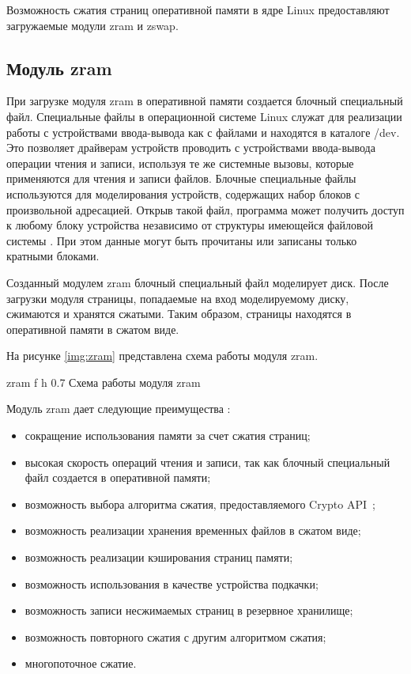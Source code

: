 Возможность сжатия страниц оперативной памяти в ядре Linux предоставляют загружаемые модули zram и zswap.

\subsection{Модуль zram}

При загрузке модуля zram в оперативной памяти создается блочный специальный файл. Специальные файлы в операционной системе Linux служат для реализации работы с устройствами ввода-вывода как с файлами и находятся в каталоге /dev. Это позволяет драйверам устройств проводить с устройствами ввода-вывода операции чтения и записи, используя те же системные
вызовы, которые применяются для чтения и записи файлов. Блочные специальные файлы используются для моделирования устройств, содержащих набор блоков с произвольной адресацией. Открыв такой файл, программа может получить доступ к любому блоку устройства независимо от структуры имеющейся файловой системы \cite{block-file}. При этом данные могут быть прочитаны или записаны только кратными блоками.

Созданный модулем zram блочный специальный файл моделирует диск. После загрузки модуля страницы, попадаемые на вход моделируемому диску, сжимаются и хранятся сжатыми. Таким образом, страницы находятся в оперативной памяти в сжатом виде.

На рисунке \ref{img:zram} представлена схема работы модуля zram.

    {zram}
    {f}
    {h}
    {0.7\textwidth}
    {Схема работы модуля zram}

Модуль zram дает следующие преимущества \cite{zram}:

\begin{itemize}
	\item сокращение использования памяти за счет сжатия страниц;
	\item высокая скорость операций чтения и записи, так как блочный специальный файл создается в оперативной памяти;
    \item возможность выбора алгоритма сжатия, предоставляемого Crypto API~\cite{crypto};
    \item возможность реализации хранения временных файлов в сжатом виде;
    \item возможность реализации кэширования страниц памяти;
    \item возможность использования в качестве устройства подкачки;
    \item возможность записи несжимаемых страниц в резервное хранилище;
    \item возможность повторного сжатия с другим алгоритмом сжатия;
    \item многопоточное сжатие.
\end{itemize}

